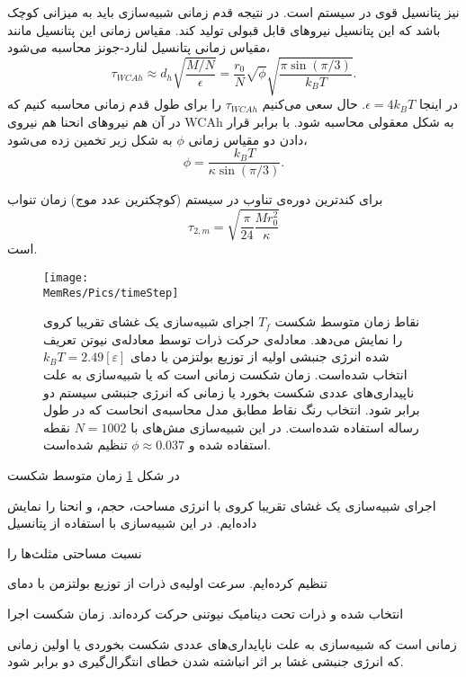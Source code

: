 نیز پتانسیل قوی در سیستم است. در نتیجه قدم زمانی شبیه‌سازی باید به میزانی کوچک باشد که این پتانسیل نیروهای قابل قبولی تولید کند. مقیاس زمانی این پتانسیل مانند مقیاس زمانی پتانسیل لنارد-جونز محاسبه می‌شود،
\begin{equation}
\tau_{WCAh}\approx d_h\sqrt{\frac{M/N}{\epsilon}}=\frac{r_0}{N}\sqrt{\phi}\sqrt{\frac{\pi\sin(\pi/3)}{k_BT}}.
\label{eq:tauWCAh}
\end{equation}
در اینجا 
$\epsilon=4k_BT$.
حال سعی می‌کنیم 
$\tau_{WCAh}$
را برای طول قدم زمانی محاسبه کنیم که در آن هم نیرو‌های انحنا هم نیروی 
WCAh
به شکل معقولی محاسبه شود. با برابر قرار دادن دو مقیاس زمانی 
$\phi$
به شکل زیر تخمین زده می‌شود،
\begin{equation}
\phi=\frac{k_BT}{\kappa\sin(\pi/3)}.
\label{eq:phiTimeScale}
\end{equation}

برای کندترین دوره‌ی تناوب در سیستم 
(کوچکترین عدد موج)
زمان تنواب
\begin{equation}
\tau_{2,m}=\sqrt{\frac{\pi}{24} \frac{Mr_0^2}{\kappa}}
\label{eq:Lperiod}
\end{equation}
است. 

\begin{figure}[htbp]
\begin{center}
\texttt{[image: \\MemRes/Pics/timeStep]}
\caption{
نقاط زمان متوسط شکست 
 $T_f$
اجرای شبیه‌سازی یک غشای تقریبا کروی را نمایش می‌دهد. معادله‌ی حرکت ذرات توسط معادله‌ی نیوتن تعریف شده انرژی جنبشی اولیه از توزیع بولتزمن با دمای
 $k_BT=2.49[\varepsilon]$
انتخاب شده‌است. زمان شکست زمانی است که یا شبیه‌سازی به علت ناپیداری‌های عددی شکست بخورد یا زمانی که انرژی جنبشی سیستم دو برابر شود. انتخاب رنگ نقاط مطابق مدل محاسبه‌ی انحاست که در طول رساله استفاده شده‌است. در این شبیه‌سازی مش‌های با 
$N=1002$
نقطه استفاده شده و 
$\phi\approx0.037$
تنظیم شده‌است.
}
\label{fig:timeSteps}
\end{center}
\end{figure}
در شکل 
\ref{fig:timeSteps}
زمان متوسط شکست

اجرای شبیه‌سازی یک غشای تقریبا کروی با انرژی مساحت، حجم، و انحنا را نمایش داده‌ایم. در این شبیه‌سازی با استفاده از پتانسیل 

نسبت مساحتی مثلث‌ها را 

تنظیم کرده‌ایم. سرعت اولیه‌ی ذرات از توزیع بولتزمن با دمای 

انتخاب شده‌ و ذرات تحت دینامیک نیوتنی حرکت کرده‌اند. زمان شکست اجرا

 زمانی است که شبیه‌سازی به علت ناپایداری‌های عددی شکست بخوردی یا اولین زمانی که انرژی جنبشی غشا بر اثر انباشته شدن خطای انتگرال‌گیری دو برابر شود. 
 
